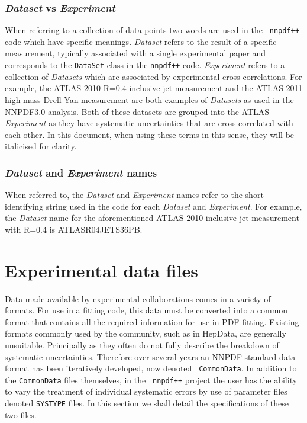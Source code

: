 \documentclass[11pt]{article}
\begin{document}
\subsubsection*{\emph{Dataset} vs \emph{Experiment}}
When referring to a collection of data points two words are used in the {\tt
nnpdf++} code which have specific meanings.  \emph{Dataset} refers to the result
of a specific measurement, typically associated with a single experimental paper
and corresponds to the {\tt DataSet} class in the {\tt nnpdf++} code.
\emph{Experiment} refers to a collection of \emph{Datasets} which are associated
by experimental cross-correlations. For example, the ATLAS 2010 R=0.4 inclusive
jet measurement and the ATLAS 2011 high-mass Drell-Yan measurement are both
examples of \emph{Datasets} as used in the NNPDF3.0 analysis. Both of these
datasets are grouped into the ATLAS \emph{Experiment} as they have systematic
uncertainties that are cross-correlated with each other. In this document, when
using these terms in this sense, they will be italicised for clarity.

\subsubsection*{\emph{Dataset} and \emph{Experiment} names}
When referred to, the \emph{Dataset} and \emph{Experiment} names refer to the
short identifying string used in the code for each \emph{Dataset} and
\emph{Experiment}.  For example, the \emph{Dataset} name for the aforementioned
ATLAS 2010 inclusive jet measurement with R=0.4 is \mbox{ATLASR04JETS36PB}.

\section{Experimental data files}\label{sec:experimental}
Data made available by experimental collaborations comes in a variety of
formats. For use in a fitting code, this data must be converted into a common
format that contains all the required information for use in PDF fitting.
Existing formats commonly used by the community, such as in HepData, are
generally unsuitable.  Principally as they often do not fully describe the
breakdown of systematic uncertainties. Therefore over several years an NNPDF
standard data format has been iteratively developed, now denoted {\tt
CommonData}. In addition to the {\tt CommonData} files themselves, in the {\tt
nnpdf++} project the user has the ability to vary the treatment of individual
systematic errors by use of parameter files denoted {\tt SYSTYPE} files. In this
section we shall detail the specifications of these two files.
\end{document}
